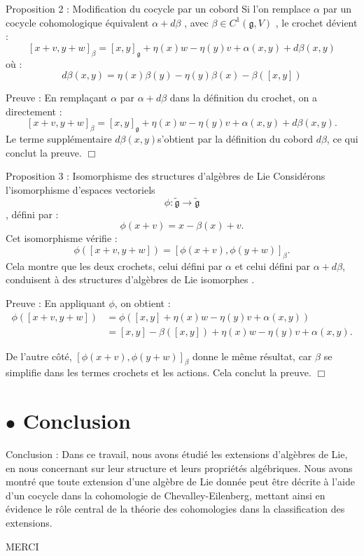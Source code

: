 \documentclass{beamer}
\begin{document}
	\begin{frame}{Proposition 2 : Modification du cocycle par un cobord}
		Si l'on remplace $ \alpha $ par un cocycle cohomologique équivalent $ \alpha+d\beta $ , avec $ \beta\in C^{1}(\mathfrak{g},V) $ , le crochet dévient :
		$$ [x+v,y+w]_{\beta}=[x,y]_{\mathfrak{g}}+\eta(x)w-\eta(y)v+\alpha(x,y)+d\beta(x,y) $$ 
		où :
		$$ d\beta(x,y)=\eta(x)\beta(y)-\eta(y)\beta(x)-\beta([x,y]) $$
	\end{frame}
	\begin{frame}{Preuve :}
		En remplaçant $\alpha$ par $\alpha + d\beta$ dans la définition du crochet, on a directement :
		$$
		[x + v, y + w]_\beta = [x, y]_{\mathfrak{g}} + \eta(x)w - \eta(y)v + \alpha(x, y) + d\beta(x, y).
		$$
		Le terme suppl\'ementaire $d\beta(x, y)$s’obtient par la d\'efinition du cobord $d\beta$, ce qui conclut la preuve. $\Box$
	\end{frame}
	\begin{frame}{Proposition 3 : Isomorphisme des structures d'algèbres de Lie}
		Considérons l’isomorphisme d’espaces vectoriels $$\phi : \mathfrak{\tilde{g}} \to \mathfrak{\tilde{g}}$$, défini par :
		$$
		\phi(x + v) = x - \beta(x) + v.
		$$
		Cet isomorphisme vérifie :
		$$
		\phi([x + v, y + w]) = [\phi(x + v), \phi(y + w)]_\beta.
		$$
		Cela montre que les deux crochets, celui défini par $\alpha$ et celui défini par $\alpha + d\beta$, conduisent à des structures d’algèbres de Lie isomorphes .
	\end{frame}
	\begin{frame}{Preuve :}
		En appliquant $\phi$, on obtient :
		\begin{align*}
			\phi([x + v, y + w]) &= \phi([x, y] + \eta(x)w - \eta(y)v + \alpha(x, y)) \\
			&= [x, y] - \beta([x, y]) + \eta(x)w - \eta(y)v + \alpha(x, y).
		\end{align*}
		
		De l’autre c\^oté, $[\phi(x + v), \phi(y + w)]_\beta$ donne le m\^eme r\'esultat, car $\beta$ se simplifie dans les termes crochets et les actions. Cela conclut la preuve. $\Box$
	\end{frame}	
	\section{$\bullet$ Conclusion}
	\begin{frame}{Conclusion :}
		Dans ce travail, nous avons étudié les extensions d'algèbres de Lie, en nous concernant sur leur   structure et leurs propriétés algébriques. Nous avons montré que toute extension d'une algèbre de Lie donnée peut être décrite à l'aide d'un cocycle dans la cohomologie de Chevalley-Eilenberg, mettant ainsi en évidence le rôle central de la théorie des cohomologies dans la classification des extensions.
	\end{frame}
	\begin{frame}
		\begin{center}
			MERCI
		\end{center}
	\end{frame}

	
\end{document}
